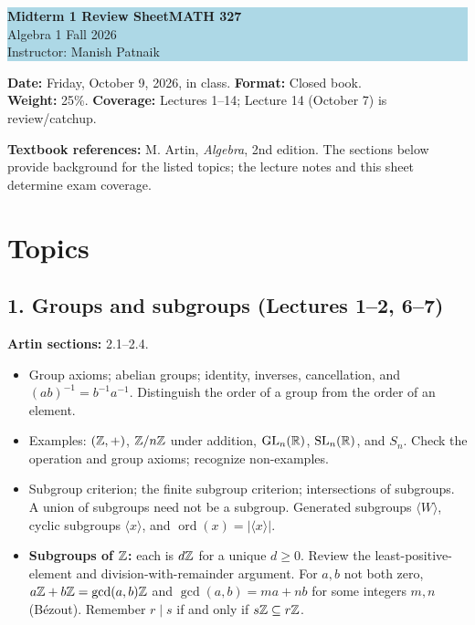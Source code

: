 \documentclass[11pt,reqno]{amsart}
\begin{document}
\begin{center}
\colorbox{lightblue}{\begin{minipage}{0.94\textwidth}
\vspace{0.5em}
{\color{courseblue}\bfseries\Large Midterm 1 Review Sheet\hfill MATH 327}\\[0.35em]
Algebra 1 \hfill Fall 2026\\
Instructor: Manish Patnaik
\vspace{0.5em}
\end{minipage}}
\end{center}
\textbf{Date:} Friday, October 9, 2026, in class.\quad
\textbf{Format:} Closed book.\\
\textbf{Weight:} 25\%.\quad
\textbf{Coverage:} Lectures 1--14; Lecture 14 (October 7) is review/catchup.

\smallskip
\noindent\textbf{Textbook references:} M. Artin, \emph{Algebra}, 2nd edition.
The sections below provide background for the listed topics; the lecture notes
and this sheet determine exam coverage.

\section*{Topics}
\subsection*{1. Groups and subgroups (Lectures 1--2, 6--7)}
\noindent\textbf{Artin sections:} 2.1--2.4.\par
\begin{itemize}
\item Group axioms; abelian groups; identity, inverses, cancellation, and
$(ab)^{-1}=b^{-1}a^{-1}$. Distinguish the order of a group from the order of an element.
\item Examples: $(\mathbb{Z},+)$, $\mathbb{Z}/n\mathbb{Z}$ under addition, $\operatorname{GL}_n(\mathbb{R})$, $\operatorname{SL}_n(\mathbb{R})$,
and $S_n$. Check the operation and group axioms; recognize non-examples.
\item Subgroup criterion; the finite subgroup criterion; intersections of subgroups.
A union of subgroups need not be a subgroup. Generated subgroups $\langle W\rangle$,
cyclic subgroups $\langle x\rangle$, and $\operatorname{ord}(x)=|\langle x\rangle|$.
\item \textbf{Subgroups of $\mathbb{Z}$:} each is $d\mathbb{Z}$ for a unique $d\geq0$.
Review the least-positive-element and division-with-remainder argument.
For $a,b$ not both zero, $a\mathbb{Z}+b\mathbb{Z}=\gcd(a,b)\mathbb{Z}$ and
$\gcd(a,b)=ma+nb$ for some integers $m,n$ (B\'ezout).
Remember $r\mid s$ if and only if $s\mathbb{Z}\subseteq r\mathbb{Z}$.
\end{itemize}
\end{document}

